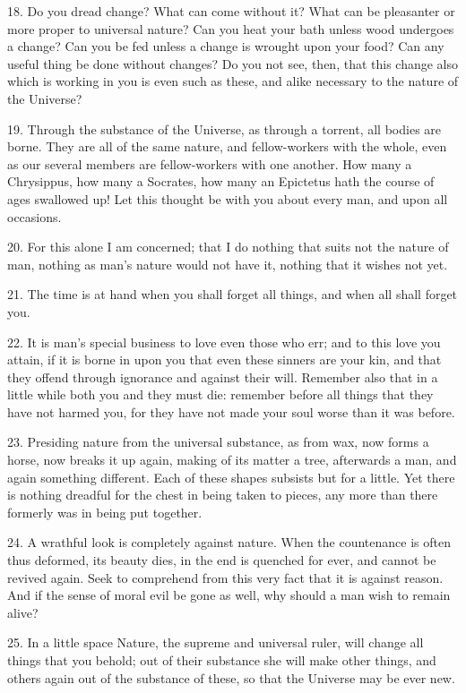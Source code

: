 \documentclass{book}
\begin{document}
18. Do you dread change? What can come without it? What can be pleasanter
or more proper to universal nature? Can you heat your bath unless wood
undergoes a change? Can you be fed unless a change is wrought upon
your food? Can any useful thing be done without changes? Do you not
see, then, that this change also which is working in you is even such
as these, and alike necessary to the nature of the Universe?

\newpage

19. Through the substance of the Universe, as through a torrent, all
bodies are borne. They are all of the same nature, and fellow-workers
with the whole, even as our several members are fellow-workers with
one another. How many a Chrysippus, how many a Socrates, how many an
Epictetus hath the course of ages swallowed up! Let this thought be
with you about every man, and upon all occasions.

20. For this alone I am concerned; that I do nothing that suits not
the nature of man, nothing as man's nature would not have it, nothing
that it wishes not yet.

21. The time is at hand when you shall forget all things, and when all
shall forget you.

22. It is man's special business to love even those who err; and to
this love you attain, if it is borne in upon you that even these
sinners are your kin, and that they offend through ignorance and
against their will. Remember also that in a little while both you and
they must die: remember before all things that they have not harmed
you, for they have not made your soul worse than it was before.

23. Presiding nature from the universal substance, as from wax, now
forms a horse, now breaks it up again, making of its matter a tree,
afterwards a man, and again something different. Each of these shapes
subsists but for a little. Yet there is nothing dreadful for the chest
in being taken to pieces, any more than there formerly was in being
put together.

24. A wrathful look is completely against nature. When the countenance
is often thus deformed, its beauty dies, in the end is quenched for
ever, and cannot be revived again. Seek to comprehend from this very
fact that it is against reason. And if the sense of moral evil be gone
as well, why should a man wish to remain alive?

25. In a little space Nature, the supreme and universal ruler, will
change all things that you behold; out of their substance she will
make other things, and others again out of the substance of these, so
that the Universe may be ever new.
\end{document}
